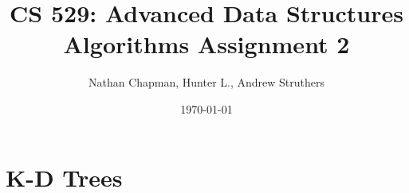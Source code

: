 \documentclass{article}
\title{CS 529: Advanced Data Structures Algorithms Assignment 2}
\author{Nathan Chapman, Hunter L., Andrew Struthers }
\date{\today}
\begin{document}
\maketitle

\section*{K-D Trees}
\end{document}
